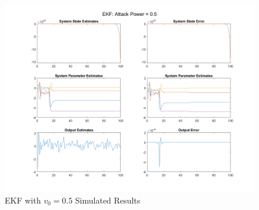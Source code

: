 \documentclass[]{article}
\begin{document}
\begin{figure}
	\centering
	\includegraphics[width=\linewidth]{../../fig/EKF_attack_0_5}
	\caption{EKF with $v_0 = 0.5$ Simulated Results}
	\label{fig:ekfattack05}
\end{figure}
\end{document}
